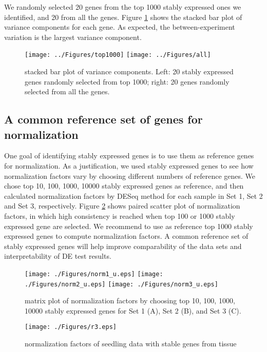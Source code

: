\documentclass[11pt, a4paper]{article}
\begin{document}
We randomly selected 20 genes from the top 1000 stably expressed ones we identified, and 20 from all the genes. Figure \ref{fig:all} shows the stacked bar plot of variance components for each gene. As expected, the between-experiment variation is the largest variance component. 

\begin{figure}[!h]
	\centering
	\texttt{[image: ../Figures/top1000]}
	\texttt{[image: ../Figures/all]}
	\caption{stacked bar plot of variance components. Left: 20 stably expressed genes randomly selected from top 1000; right: 20 genes randomly selected from all the genes.}
	\label{fig:all}
\end{figure}




\subsection{A common reference set of genes for normalization}
One goal of identifying stably expressed genes is to use them as reference genes for normalization. As a justification, we used stably expressed genes to see how normalization factors vary by choosing different numbers of reference genes.   We chose top 10, 100, 1000, 10000 stably expressed genes as reference, and then calculated normalization factors by DESeq method for each sample in Set 1, Set 2 and Set 3, respectively. Figure \ref{fig:normfactor} shows paired scatter plot of normalization factors, in which high consistency is reached when top 100 or 1000 stably expressed gene are selected. We recommend to use as reference top 1000 stably expressed genes to compute normalization factors. A common reference set of stably expressed genes will help improve comparability of the data sets and interpretability of DE test results.



 \begin{figure}[h!]
\begin{center}
\texttt{[image: ./Figures/norm1\_u.eps]}
\texttt{[image: ./Figures/norm2\_u.eps]}
\texttt{[image: ./Figures/norm3\_u.eps]}
\caption{\label{fig:normfactor} matrix plot of normalization factors by choosing top 10, 100, 1000, 10000 stably expressed genes for Set 1 (A), Set 2 (B), and Set 3 (C). }
\end{center}
\end{figure}

 \begin{figure}[h!]
\begin{center}
\texttt{[image: ./Figures/r3.eps]}
\caption{\label{fig:scaled_diss} normalization factors of seedling data with stable genes from tissue }
\end{center}
\end{figure}
\end{document}
